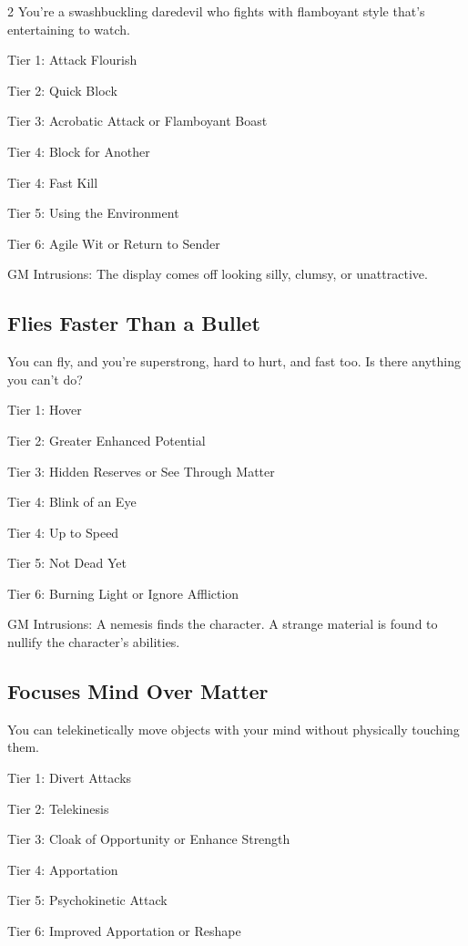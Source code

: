 \begin{multicols}{2}
You’re a swashbuckling daredevil who fights with flamboyant style that’s entertaining to watch.

Tier 1: Attack Flourish

Tier 2: Quick Block

Tier 3: Acrobatic Attack or Flamboyant Boast

Tier 4: Block for Another

Tier 4: Fast Kill

Tier 5: Using the Environment

Tier 6: Agile Wit or Return to Sender

GM Intrusions: The display comes off looking silly, clumsy, or unattractive. 

\subsection{Flies Faster Than a Bullet}

You can fly, and you’re superstrong, hard to hurt, and fast too. Is there anything you can’t do?

Tier 1: Hover

Tier 2: Greater Enhanced Potential

Tier 3: Hidden Reserves or See Through Matter

Tier 4: Blink of an Eye

Tier 4: Up to Speed

Tier 5: Not Dead Yet

Tier 6: Burning Light or Ignore Affliction

GM Intrusions: A nemesis finds the character. A strange material is found to nullify the character’s abilities.

\subsection{Focuses Mind Over Matter}

You can telekinetically move objects with your mind without physically touching them.

Tier 1: Divert Attacks

Tier 2: Telekinesis

Tier 3: Cloak of Opportunity or Enhance Strength

Tier 4: Apportation

Tier 5: Psychokinetic Attack

Tier 6: Improved Apportation or Reshape


\end{multicols}

